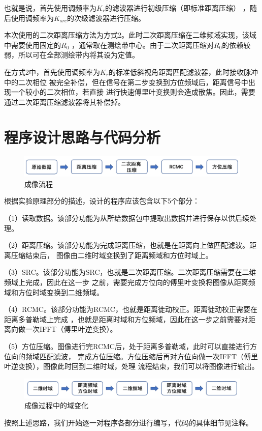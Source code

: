 \documentclass{article}
\begin{document}
也就是说，首先使用调频率为$K_r$的滤波器进行初级压缩（即标准距离压缩）
，随后使用调频率为$K_{src}$的次级滤波器进行压缩。
	
本次使用的二次距离压缩方法为方式2。此时二次距离压缩在二维频域实现，该域中需要使用固定的$R_0$
，通常取在测绘带中心。由于二次距离压缩对$R_0$的依赖较弱，所以可在全部测绘带内将其设为定值。

在方式2中，首先使用调频率为$K_r$的标准低斜视角距离匹配滤波器，此时接收脉冲中的二次相位
被完全补偿，但在信号在第二步变换到方位频域后，距离信号中出现一个较小的二次相位，若直接
进行快速傅里叶变换则会造成散焦。因此，需要通过二次距离压缩滤波器将其补偿掉。


\section{程序设计思路与代码分析}

\begin{figure}[H] %
	\centering
	\includegraphics[scale=0.45]{2.png}
	\caption{成像流程}
	\label{2}
\end{figure}

根据实验原理部分的描述，设计的程序应该包含以下5个部分：

（1）读取数据。该部分功能为从所给数据包中提取出数据并进行保存以供后续处理。

（2）距离压缩。该部分功能为完成距离压缩，也就是在距离向上做匹配滤波。距离压缩结束后，
图像由二维时域变换到了距离频域和方位时域上。

（3）SRC。该部分功能为SRC，也就是二次距离压缩。二次距离压缩需要在二维频域上完成，因此在这一步
之前，需要完成方位向的傅里叶变换将图像从距离频域和方位时域变换到二维频域。

（4）RCMC。该部分功能为RCMC，也就是距离徙动校正。距离徙动校正需要在距离多普勒域上完成
，也就是距离时域和方位频域，因此在这一步之前需要对距离向做一次IFFT（傅里叶逆变换）。

（5）方位压缩。图像进行完RCMC后，处于距离多普勒域，此时可以直接进行方位向的频域匹配滤波，
完成方位压缩。方位压缩后再对方位向做一次IFFT（傅里叶逆变换），图像此时回到二维时域，处理
流程结束，我们可以将图像进行输出。
\begin{figure}[H] %
	\centering
	\includegraphics[scale=0.45]{3.png}
	\caption{成像过程中的域变化}
	\label{3}
\end{figure}
按照上述思路，我们开始逐一对程序各部分进行编写，代码的具体细节见注释。
\end{document}
